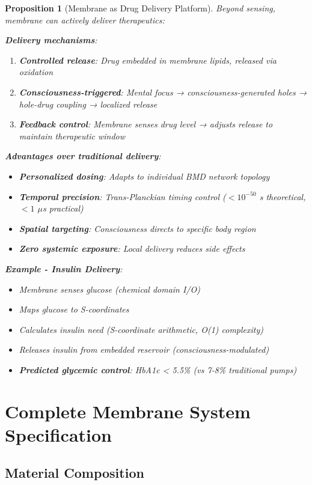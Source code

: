 \documentclass[11pt,a4paper]{article}
\newtheorem{proposition}[theorem]{Proposition}
\theoremstyle{definition}
\theoremstyle{remark}
\begin{document}
\begin{proposition}[Membrane as Drug Delivery Platform]
Beyond sensing, membrane can actively deliver therapeutics:

\textbf{Delivery mechanisms}:
\begin{enumerate}
\item \textbf{Controlled release}: Drug embedded in membrane lipids, released via oxidation
\item \textbf{Consciousness-triggered}: Mental focus → consciousness-generated holes → hole-drug coupling → localized release
\item \textbf{Feedback control}: Membrane senses drug level → adjusts release to maintain therapeutic window
\end{enumerate}

\textbf{Advantages over traditional delivery}:
\begin{itemize}
\item \textbf{Personalized dosing}: Adapts to individual BMD network topology
\item \textbf{Temporal precision}: Trans-Planckian timing control ($< 10^{-50}$ s theoretical, $< 1$ $\mu$s practical)
\item \textbf{Spatial targeting}: Consciousness directs to specific body region
\item \textbf{Zero systemic exposure}: Local delivery reduces side effects
\end{itemize}

\textbf{Example - Insulin Delivery}:
\begin{itemize}
\item Membrane senses glucose (chemical domain I/O)
\item Maps glucose to S-coordinates
\item Calculates insulin need (S-coordinate arithmetic, O(1) complexity)
\item Releases insulin from embedded reservoir (consciousness-modulated)
\item \textbf{Predicted glycemic control}: HbA1c < 5.5\% (vs 7-8\% traditional pumps)
\end{itemize}
\end{proposition}

\section{Complete Membrane System Specification}

\subsection{Material Composition}
\end{document}
